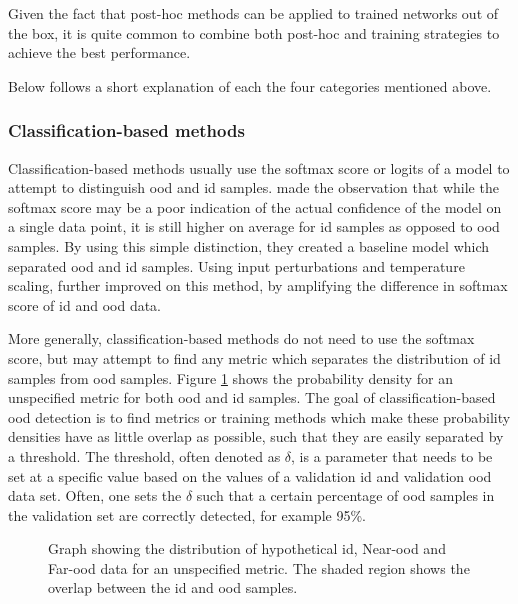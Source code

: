 \documentclass[UKenglish]{uiomasterthesis} %
\theoremstyle{definition}
\begin{document}
Given the fact that post-hoc methods can be applied to trained networks out of the box, it is quite common to combine both post-hoc and training strategies to achieve the best performance.


Below follows a short explanation of each the four categories mentioned above.
\\

\subsubsection{Classification-based methods}

Classification-based methods usually use the softmax score or logits of a model to attempt to distinguish \ac{ood} and \ac{id} samples. \cite{oodbaseline} made the observation that while the softmax score may be a poor indication of the actual confidence of the model on a single data point, it is still higher on average for \ac{id} samples as opposed to \ac{ood} samples. By using this simple distinction, they created a baseline model which separated \ac{ood} and \ac{id} samples. Using input perturbations and temperature scaling, \cite{odin} further improved on this method, by amplifying the difference in softmax score of \ac{id} and \ac{ood} data. 

More generally, classification-based methods do not need to use the softmax score, but may attempt to find any metric which separates the distribution of \ac{id} samples from \ac{ood} samples. Figure \ref{fig:ood_metric} shows the probability density for an unspecified metric for both \ac{ood} and \ac{id} samples. The goal of classification-based \ac{ood} detection is to find metrics or training methods which make these probability densities have as little overlap as possible, such that they are easily separated by a threshold. The threshold, often denoted as $\delta$, is a parameter that needs to be set at a specific value based on the values of a validation \ac{id} and validation \ac{ood} data set. Often, one sets the $\delta$ such that a certain percentage of \ac{ood} samples in the validation set are correctly detected, for example 95\%.

\begin{figure}[h]
    \begin{center}
        
    \end{center}
    \caption[Hypothetical \ac{id}/\ac{ood} distributions for an \ac{ood} detection metric]{Graph showing the distribution of hypothetical \ac{id}, Near-\ac{ood} and Far-\ac{ood} data for an unspecified metric. The shaded region shows the overlap between the \ac{id} and \ac{ood} samples.}
    \label{fig:ood_metric}
\end{figure}
\end{document}

